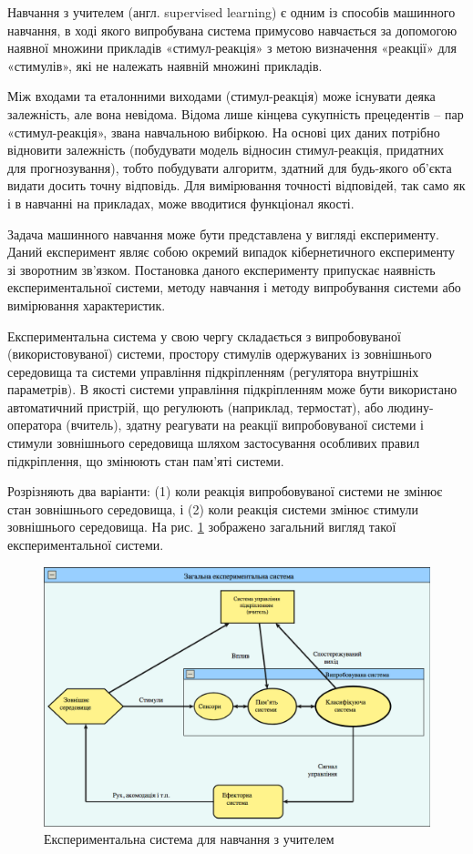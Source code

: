 Навчання з учителем (англ. supervised learning) є одним із способів машинного навчання, в ході якого випробувана система примусово навчається за допомогою наявної множини прикладів «стимул-реакція» з метою визначення «реакції» для «стимулів», які не належать наявній множині прикладів. 

Між входами та еталонними виходами (стимул-реакція) може існувати деяка залежність, але вона невідома. Відома лише кінцева сукупність прецедентів – пар «стимул-реакція», звана навчальною вибіркою. На основі цих даних потрібно відновити залежність (побудувати модель відносин стимул-реакція, придатних для прогнозування), тобто побудувати алгоритм, здатний для будь-якого об'єкта видати досить точну відповідь. Для вимірювання точності відповідей, так само як і в навчанні на прикладах, може вводитися функціонал якості.

Задача машинного навчання може бути представлена у вигляді експерименту. Даний експеримент являє собою окремий випадок кібернетичного експерименту зі зворотним зв'язком. Постановка даного експерименту припускає наявність експериментальної системи, методу навчання і методу випробування системи або вимірювання характеристик.

Експериментальна система у свою чергу складається з випробовуваної (використовуваної) системи, простору стимулів одержуваних із зовнішнього середовища та системи управління підкріпленням (регулятора внутрішніх параметрів). В якості системи управління підкріпленням може бути використано автоматичний пристрій, що регулюють (наприклад, термостат), або людину-оператора (вчитель), здатну реагувати на реакції випробовуваної системи і стимули зовнішнього середовища шляхом застосування особливих правил підкріплення, що змінюють стан пам'яті системи.

Розрізняють два варіанти: (1) коли реакція випробовуваної системи не змінює стан зовнішнього середовища, і (2) коли реакція системи змінює стимули зовнішнього середовища. На рис. \ref{fig:experiment_system} зображено загальний вигляд такої експериментальної системи.
\begin{figure}[h!]
  \includegraphics[width=\linewidth]{figures/fig_system.png}
  \caption{Експериментальна система для навчання з учителем}
  \label{fig:experiment_system}
\end{figure}


